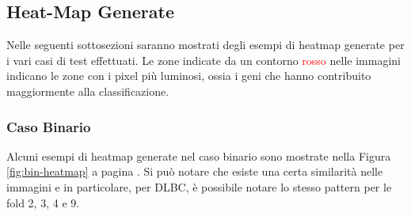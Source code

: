 \subsection{Heat-Map Generate}
\label{subsec:gen_heatmap}
Nelle seguenti sottosezioni saranno mostrati degli esempi di heatmap generate per i vari casi di test effettuati.
Le zone indicate da un contorno \textcolor{red}{rosso} nelle immagini indicano le zone con i pixel più luminosi, ossia
i geni che hanno contribuito maggiormente alla classificazione.

\subsubsection{Caso Binario}
Alcuni esempi di heatmap generate nel caso binario sono mostrate nella Figura \ref{fig:bin-heatmap} a pagina 
\pageref{fig:bin-heatmap}.
Si può notare che esiste una certa similarità nelle immagini e in particolare, per DLBC, è possibile
notare lo stesso pattern per le fold 2, 3, 4 e 9.


